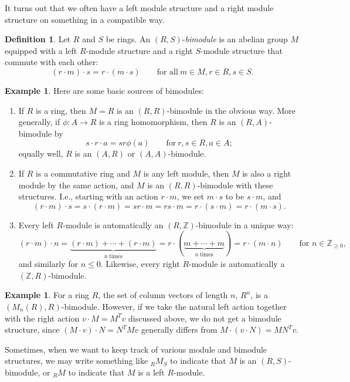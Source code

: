 \documentclass{amsart}[12pt]
\newcommand{\Z}{\mathbb{Z}}
\newcommand{\DEF}[1]{\emph{#1}\index{#1}}
\newcommand{\Def}[1]{#1 \index{#1}}
\numberwithin{equation}{section}
\theoremstyle{plain} %
\theoremstyle{definition}
\newtheorem{defn}[equation]{Definition}
\newtheorem{ex}[equation]{Example}
\theoremstyle{remark}
\begin{document}
It turns out that we often have a left module structure and a right module structure on something in a compatible way.

\begin{defn} Let $R$ and $S$ be rings. An $(R,S)$-\DEF{bimodule} is an abelian group $M$ equipped with a left $R$-module structure and a right $S$-module structure that commute with each other:
\[ (r \cdot m) \cdot s = r \cdot (m \cdot s) \qquad \text{for all}\ m\in M, r\in R, s\in S.\]
\end{defn} 

\begin{ex} Here are some basic sources of bimodules:
\begin{enumerate}
\item If $R$ is a ring, then $M=R$ is an $(R,R)$-bimodule in the obvious way. More generally, if $\phi:A\to R$ is a ring homomorphism, then $R$ is an $(R,A)$-bimodule by
\[ s \cdot r \cdot a = sr\phi(a) \qquad \text{for} \ r,s\in R, a\in A;\]
equally well, $R$ is an $(A,R)$ or $(A,A)$-bimodule.
\item If $R$ is a commutative ring and $M$ is any left module, then $M$ is also a right module by the same action, and $M$ is an $(R,R)$-bimodule with these structures. I.e., starting with an action $r\cdot m$, we set $m\cdot s$ to be $s\cdot m$, and \[(r\cdot m) \cdot s = s\cdot (r\cdot m) = sr \cdot m = rs \cdot m = r\cdot (s\cdot m) = r \cdot (m\cdot s).\]
\item Every left $R$-module is automatically an $(R,\Z)$-bimodule in a unique way: \[(r\cdot m) \cdot n= \underbrace{(r\cdot m) + \cdots + (r\cdot m)}_{n \ \text{times}} = r \cdot (\underbrace{m+\cdots + m}_{n \ \text{times}}) = r \cdot (m \cdot n) \qquad \text{for $n\in \Z_{\geq 0}$},\]
and similarly for $n\leq 0$.
Likewise, every right $R$-module is automatically a $(\Z,R)$-bimodule.
\end{enumerate}
\end{ex}

\begin{ex} For a ring $R$, the set of column vectors of length $n$, $R^n$, is a $(M_n(R),R)$-bimodule. However, if we take the natural left action together with the right action $v\cdot M = M^T v$ discussed above, we do not get a bimodule structure, since $(M\cdot v)\cdot N = N^T M v$ generally differs from $M \cdot (v \cdot N) = M N^T v$.
\end{ex}

Sometimes, when we want to keep track of various module and bimodule structures, we may write something like \Def{$_R M _S$} to indicate that $M$ is an $(R,S)$-bimodule, or $_R M$ to indicate that $M$ is a left $R$-module.
\end{document}
